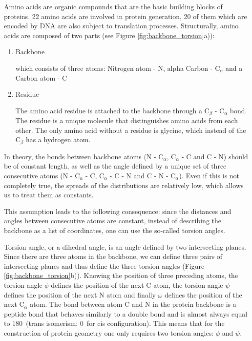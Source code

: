 

Amino acids are organic compounds that are the basic building blocks of proteins. 
22 amino acids are involved in protein generation, 20 of them which are encoded by DNA are also subject to translation processes. 
Structurally, amino acids are composed of two parts (see Figure \ref{fig:backbone_torsion}a)):

\begin{enumerate}
    \item Backbone
    
        which consists of three atoms: Nitrogen atom - N, alpha Carbon - C$_\alpha$ and a Carbon atom - C
    \item Residue
        
        The amino acid residue is attached to the backbone through a C$_\beta$ - C$_\alpha$ bond. The residue is a unique molecule that distinguishes amino acids from each other. The only amino acid without a residue is glycine, which instead of the C$_\beta$ has a hydrogen atom.
\end{enumerate}

In theory, the bonds between backbone atoms (N - C$_\alpha$, C$_\alpha$ - C and C - N) should be of constant length, as well as the angle defined by a unique set of three consecutive atoms (N - C$_\alpha$ - C, C$_\alpha$ - C - N and C - N - C$_\alpha$). 
Even if this is not completely true, the spreads of the distributions are relatively low, which allows us to treat them as constants.

This assumption leads to the following consequence: since the distances and angles between consecutive atoms are constant, instead of describing the backbone as a list of coordinates, one can use the so-called torsion angles.

Torsion angle, or a dihedral angle, is an angle defined by two intersecting planes. 
Since there are three atoms in the backbone, we can define three pairs of intersecting planes and thus define the three torsion angles (Figure \ref{fig:backbone_torsion}b)). 
Knowing the position of three preceding atoms, the torsion angle $\phi$ defines the position of the next C atom, the torsion angle $\psi$ defines the position of the next N atom and finally $\omega$ defines the position of the next C$_\alpha$ atom. 
The bond between atom C and N in the protein backbone is a peptide bond that behaves similarly to a double bond and is almost always equal to 180\degree~(trans isomerism; 0\degree~for cis configuration). 
This means that for the construction of protein geometry one only requires two torsion angles: $\phi$ and $\psi$.

